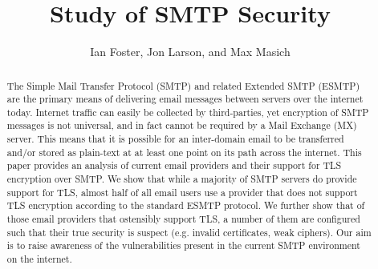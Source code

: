 \documentclass[11pt, twocolumn]{article}
\author{Ian Foster, Jon Larson, and Max Masich}
\title{Study of SMTP Security}
\date{}
\begin{document}
\maketitle
\begin{abstract}
The Simple Mail Transfer Protocol (SMTP) and related Extended SMTP (ESMTP) are the primary means of delivering email messages between servers over the internet today.  Internet traffic can easily be collected by third-parties, yet encryption of SMTP messages is not universal, and in fact cannot be required by a Mail Exchange (MX) server.  This means that it is possible for an inter-domain email to be transferred and/or stored as plain-text at at least one point on its path across the internet.  This paper provides an analysis of current email providers and their support for TLS encryption over SMTP.  We show that while a majority of SMTP servers do provide support for TLS, almost half of all email users use a provider that does not support TLS encryption according to the standard ESMTP protocol.  We further show that of those email providers that ostensibly support TLS, a number of them are configured such that their true security is suspect (e.g. invalid certificates, weak ciphers).  Our aim is to raise awareness of the vulnerabilities present in the current SMTP environment
on the internet.
\end{abstract}


\end{document}
